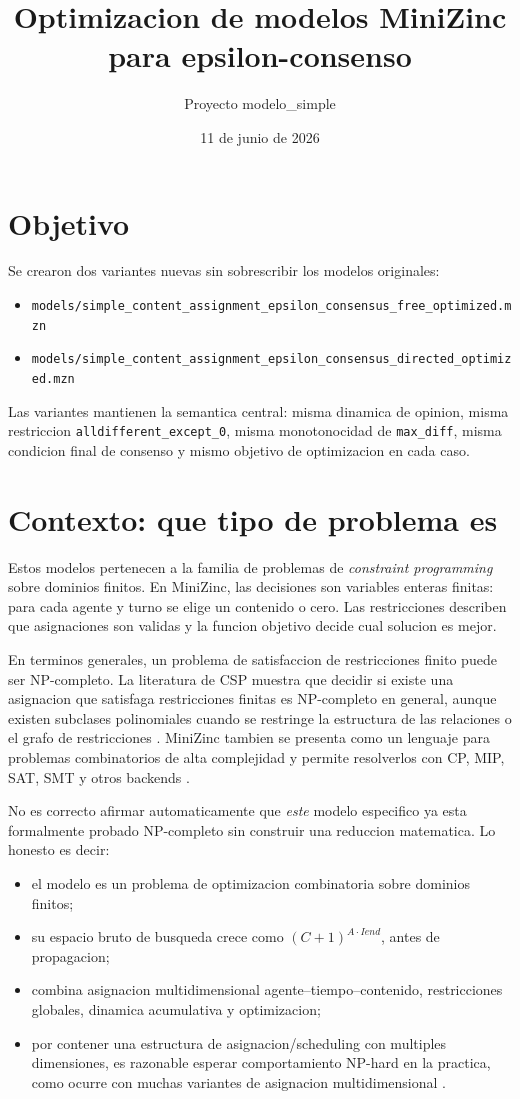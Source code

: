 \documentclass[11pt,a4paper]{article}
\title{Optimizacion de modelos MiniZinc para epsilon-consenso}
\author{Proyecto modelo\_simple}
\date{11 de junio de 2026}
\begin{document}
\maketitle

\section{Objetivo}
Se crearon dos variantes nuevas sin sobrescribir los modelos originales:
\begin{itemize}
  \item \texttt{models/simple\_content\_assignment\_epsilon\_consensus\_free\_optimized.mzn}
  \item \texttt{models/simple\_content\_assignment\_epsilon\_consensus\_directed\_optimized.mzn}
\end{itemize}

Las variantes mantienen la semantica central: misma dinamica de opinion, misma restriccion \texttt{alldifferent\_except\_0}, misma monotonocidad de \texttt{max\_diff}, misma condicion final de consenso y mismo objetivo de optimizacion en cada caso.

\section{Contexto: que tipo de problema es}
Estos modelos pertenecen a la familia de problemas de \textit{constraint programming} sobre dominios finitos. En MiniZinc, las decisiones son variables enteras finitas: para cada agente y turno se elige un contenido o cero. Las restricciones describen que asignaciones son validas y la funcion objetivo decide cual solucion es mejor.

En terminos generales, un problema de satisfaccion de restricciones finito puede ser NP-completo. La literatura de CSP muestra que decidir si existe una asignacion que satisfaga restricciones finitas es NP-completo en general, aunque existen subclases polinomiales cuando se restringe la estructura de las relaciones o el grafo de restricciones \cite{csp-complexity,zhuk2017}. MiniZinc tambien se presenta como un lenguaje para problemas combinatorios de alta complejidad y permite resolverlos con CP, MIP, SAT, SMT y otros backends \cite{minizinc-about}.

No es correcto afirmar automaticamente que \textit{este} modelo especifico ya esta formalmente probado NP-completo sin construir una reduccion matematica. Lo honesto es decir:
\begin{itemize}
  \item el modelo es un problema de optimizacion combinatoria sobre dominios finitos;
  \item su espacio bruto de busqueda crece como \((C+1)^{A\cdot Iend}\), antes de propagacion;
  \item combina asignacion multidimensional agente--tiempo--contenido, restricciones globales, dinamica acumulativa y optimizacion;
  \item por contener una estructura de asignacion/scheduling con multiples dimensiones, es razonable esperar comportamiento NP-hard en la practica, como ocurre con muchas variantes de asignacion multidimensional \cite{multidim-assignment}.
\end{itemize}
\end{document}
